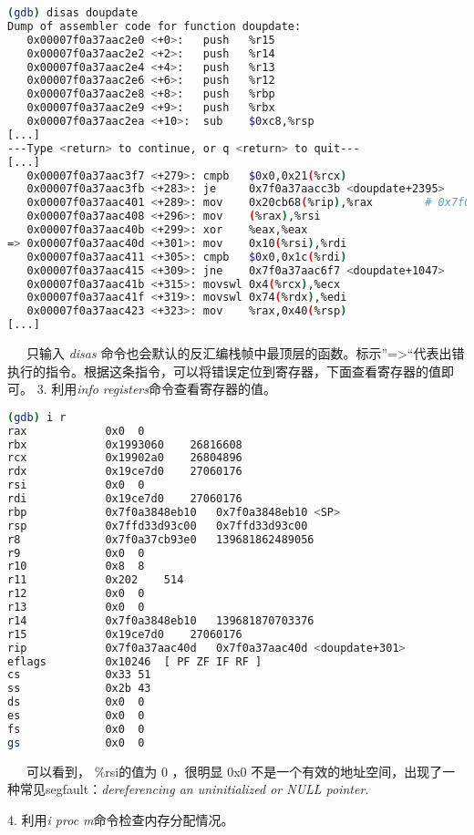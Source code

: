 \documentclass[12pt]{article}  %
\begin{document}
\begin{lstlisting}[language=sh]
(gdb) disas doupdate
Dump of assembler code for function doupdate:
   0x00007f0a37aac2e0 <+0>:   push   %r15
   0x00007f0a37aac2e2 <+2>:   push   %r14
   0x00007f0a37aac2e4 <+4>:   push   %r13
   0x00007f0a37aac2e6 <+6>:   push   %r12
   0x00007f0a37aac2e8 <+8>:   push   %rbp
   0x00007f0a37aac2e9 <+9>:   push   %rbx
   0x00007f0a37aac2ea <+10>:  sub    $0xc8,%rsp
[...]
---Type <return> to continue, or q <return> to quit---
[...]
   0x00007f0a37aac3f7 <+279>: cmpb   $0x0,0x21(%rcx)
   0x00007f0a37aac3fb <+283>: je     0x7f0a37aacc3b <doupdate+2395>
   0x00007f0a37aac401 <+289>: mov    0x20cb68(%rip),%rax        # 0x7f0a37cb8f70
   0x00007f0a37aac408 <+296>: mov    (%rax),%rsi
   0x00007f0a37aac40b <+299>: xor    %eax,%eax
=> 0x00007f0a37aac40d <+301>: mov    0x10(%rsi),%rdi
   0x00007f0a37aac411 <+305>: cmpb   $0x0,0x1c(%rdi)
   0x00007f0a37aac415 <+309>: jne    0x7f0a37aac6f7 <doupdate+1047>
   0x00007f0a37aac41b <+315>: movswl 0x4(%rcx),%ecx
   0x00007f0a37aac41f <+319>: movswl 0x74(%rdx),%edi
   0x00007f0a37aac423 <+323>: mov    %rax,0x40(%rsp)
[...]

\end{lstlisting}
\ \ \ 只输入 \emph{disas} 命令也会默认的反汇编栈帧中最顶层的函数。标示”=>“代表出错执行的指令。根据这条指令，可以将错误定位到寄存器，下面查看寄存器的值即可。
3. 利用\emph{info registers}命令查看寄存器的值。\par
\begin{lstlisting}[language=sh]
(gdb) i r
rax            0x0  0
rbx            0x1993060    26816608
rcx            0x19902a0    26804896
rdx            0x19ce7d0    27060176
rsi            0x0  0
rdi            0x19ce7d0    27060176
rbp            0x7f0a3848eb10   0x7f0a3848eb10 <SP>
rsp            0x7ffd33d93c00   0x7ffd33d93c00
r8             0x7f0a37cb93e0   139681862489056
r9             0x0  0
r10            0x8  8
r11            0x202    514
r12            0x0  0
r13            0x0  0
r14            0x7f0a3848eb10   139681870703376
r15            0x19ce7d0    27060176
rip            0x7f0a37aac40d   0x7f0a37aac40d <doupdate+301>
eflags         0x10246  [ PF ZF IF RF ]
cs             0x33 51
ss             0x2b 43
ds             0x0  0
es             0x0  0
fs             0x0  0
gs             0x0  0
\end{lstlisting}
\ \ \ 可以看到， \%rsi的值为 0 ，很明显 0x0 不是一个有效的地址空间，出现了一种常见segfault：\emph{dereferencing an uninitialized or NULL pointer.}\par
4. 利用\emph{i proc m}命令检查内存分配情况。\par 
\end{document}
